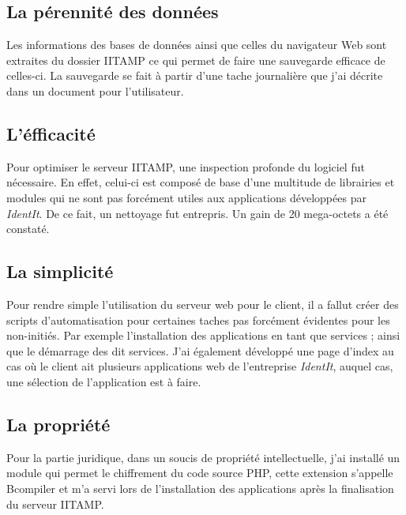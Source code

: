 \subsection{La pérennité des données} %
\label{sub:La pérennité des données}

Les informations des bases de données ainsi que celles du navigateur Web
sont extraites du dossier IITAMP ce qui permet de faire une sauvegarde
efficace de celles-ci. La sauvegarde se fait à partir d'une tache
journalière que j'ai décrite dans un document pour l'utilisateur.

\subsection{L'éfficacité} %
\label{sub:L'éfficacité}

Pour optimiser le serveur IITAMP, une inspection profonde du logiciel
fut nécessaire. En effet, celui-ci est composé de base d'une multitude
de librairies et modules qui ne sont pas forcément utiles aux
applications développées par \emph{IdentIt}. De ce fait, un nettoyage
fut entrepris. Un gain de 20 mega-octets a été constaté.

\subsection{La simplicité} %
\label{sub:La simplicité}

Pour rendre simple l'utilisation du serveur web pour le client, il a
fallut créer des scripts d'automatisation pour certaines taches pas
forcément évidentes pour les non-initiés. Par exemple l'installation des
applications en tant que services ; ainsi que le démarrage des dit
services.  J'ai également développé une page d'index au cas où le client
ait plusieurs applications web de l'entreprise \emph{IdentIt}, auquel
cas, une sélection de l'application est à faire.

\subsection{La propriété} %
\label{sub:La propriété}

Pour la partie juridique, dans un soucis de propriété intellectuelle,
j'ai installé un module qui permet le chiffrement du code source PHP,
cette extension s'appelle Bcompiler et m'a servi lors de l'installation
des applications après la finalisation du serveur IITAMP.

